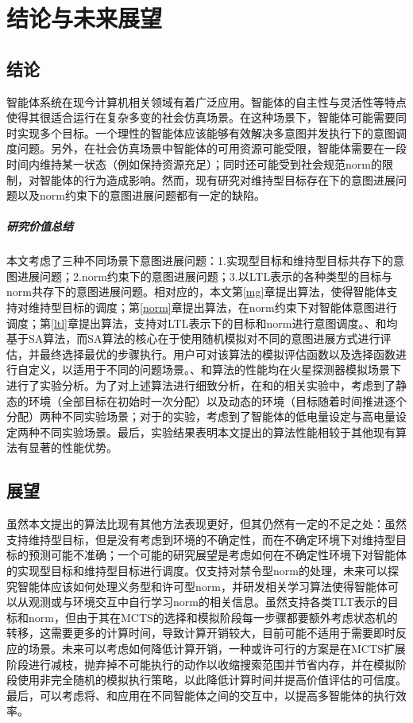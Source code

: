 \chapter{结论与未来展望}
\section{结论}
智能体系统在现今计算机相关领域有着广泛应用。智能体的自主性与灵活性等特点使得其很适合运行在复杂多变的社会仿真场景。在这种场景下，智能体可能需要同时实现多个目标。一个理性的智能体应该能够有效解决多意图并发执行下的意图调度问题。另外，在社会仿真场景中智能体的可用资源可能受限，智能体需要在一段时间内维持某一状态（例如保持资源充足）；同时还可能受到社会规范norm的限制，对智能体的行为造成影响。然而，现有研究对维持型目标存在下的意图进展问题以及norm约束下的意图进展问题都有一定的缺陷。
\paragraph{研究价值总结}
本文考虑了三种不同场景下意图进展问题：1.实现型目标和维持型目标共存下的意图进展问题；2.norm约束下的意图进展问题；3.以LTL表示的各种类型的目标与norm共存下的意图进展问题。相对应的，本文第\ref{mg}章提出\SAM 算法，使得智能体支持对维持型目标的调度；第\ref{norm}章提出\SAN 算法，在norm约束下对智能体意图进行调度；第\ref{ltl}章提出\SAT 算法，支持对LTL表示下的目标和norm进行意图调度。\SAM 、\SAN 和\SAT 均基于SA算法，而SA算法的核心在于使用随机模拟对不同的意图进展方式进行评估，并最终选择最优的步骤执行。用户可对该算法的模拟评估函数以及选择函数进行自定义，以适用于不同的问题场景。\SAM 、\SAN 和\SAT 算法的性能均在火星探测器模拟场景下进行了实验分析。为了对上述算法进行细致分析，在\SAM 和\SAN 的相关实验中，考虑到了静态的环境（全部目标在初始时一次分配）以及动态的环境（目标随着时间推进逐个分配）两种不同实验场景；对于\SAT 的实验，考虑到了智能体的低电量设定与高电量设定两种不同实验场景。最后，实验结果表明本文提出的算法性能相较于其他现有算法有显著的性能优势。
\section{展望}
虽然本文提出的算法比现有其他方法表现更好，但其仍然有一定的不足之处：\SAM 虽然支持维持型目标，但是没有考虑到环境的不确定性，而在不确定环境下\SAM 对维持型目标的预测可能不准确；一个可能的研究展望是考虑如何在不确定性环境下对智能体的实现型目标和维持型目标进行调度。\SAN 仅支持对禁令型norm的处理，未来可以探究智能体应该如何处理义务型和许可型norm，并研发相关学习算法使得智能体可以从观测或与环境交互中自行学习norm的相关信息。\SAT 虽然支持各类TLT表示的目标和norm，但由于其在MCTS的选择和模拟阶段每一步骤都要额外考虑状态机的转移，这需要更多的计算时间，导致计算开销较大，目前可能不适用于需要即时反应的场景。未来可以考虑如何降低计算开销，一种或许可行的方案是在MCTS扩展阶段进行减枝，抛弃掉不可能执行的动作以收缩搜索范围并节省内存，并在模拟阶段使用非完全随机的模拟执行策略，以此降低计算时间并提高价值评估的可信度。最后，可以考虑将\SAM 、\SAN 和\SAT 应用在不同智能体之间的交互中，以提高多智能体的执行效率。
